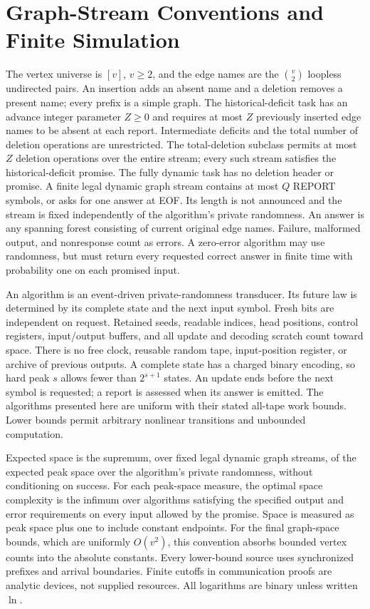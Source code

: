 \documentclass[11pt,letterpaper]{article}
\numberwithin{equation}{section}
\begin{document}
\section{Graph-Stream Conventions and Finite Simulation}
\label{app:machine-conventions}
The vertex universe is $[v]$, $v\ge2$, and the edge names are the $\binom{v}{2}$ loopless undirected pairs.
An insertion adds an absent name and a deletion removes a present name; every prefix is a simple graph.
The historical-deficit task has an advance integer parameter $Z\ge0$ and requires at most $Z$ previously inserted edge names to be absent at each report.
Intermediate deficits and the total number of deletion operations are unrestricted.
The total-deletion subclass permits at most $Z$ deletion operations over the entire stream; every such stream satisfies the historical-deficit promise.
The fully dynamic task has no deletion header or promise.
A finite legal dynamic graph stream contains at most $Q$ REPORT symbols, or asks for one answer at EOF.
Its length is not announced and the stream is fixed independently of the algorithm's private randomness.
An answer is any spanning forest consisting of current original edge names.
Failure, malformed output, and nonresponse count as errors.
A zero-error algorithm may use randomness, but must return every requested correct answer in finite time with probability one on each promised input.

An algorithm is an event-driven private-randomness transducer.
Its future law is determined by its complete state and the next input symbol.
Fresh bits are independent on request.
Retained seeds, readable indices, head positions, control registers, input/output buffers, and all update and decoding scratch count toward space.
There is no free clock, reusable random tape, input-position register, or archive of previous outputs.
A complete state has a charged binary encoding, so hard peak $s$ allows fewer than $2^{s+1}$ states.
An update ends before the next symbol is requested; a report is assessed when its answer is emitted.
The algorithms presented here are uniform with their stated all-tape work bounds.
Lower bounds permit arbitrary nonlinear transitions and unbounded computation.

Expected space is the supremum, over fixed legal dynamic graph streams, of the expected peak space over the algorithm's private randomness, without conditioning on success.
For each peak-space measure, the optimal space complexity is the infimum over algorithms satisfying the specified output and error requirements on every input allowed by the promise.
Space is measured as peak space plus one to include constant endpoints.
For the final graph-space bounds, which are uniformly $O(v^2)$, this convention absorbs bounded vertex counts into the absolute constants.
Every lower-bound source uses synchronized prefixes and arrival boundaries.
Finite cutoffs in communication proofs are analytic devices, not supplied resources.
All logarithms are binary unless written $\ln$.
\end{document}
